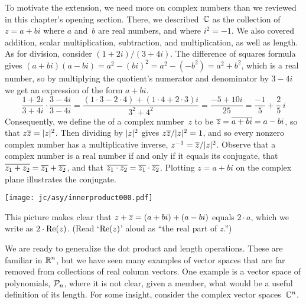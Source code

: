 To motivate the extension, 
we need more on complex numbers than we reviewed in this 
chapter's opening section.
There, we described~$\mathbb{C}$ as 
the collection of $z=a+bi$ where $a$ and~$b$ are real numbers,
and where $i^2=-1$. 
We also covered addition, scalar multiplication,
subtraction, and multiplication, as well as length.
As for division,  consider $(1+2i)/(3+4i)$.
The difference of squares formula
gives $(a+bi)(a-bi)=a^2-(bi)^2=a^2-(-b^2)=a^2+b^2$,
which is a real number,
so 
by multiplying the quotient's numerator and denominator by $3-4i$
we get an expression of the form $a+bi$.
\begin{equation*}
  \frac{1+2i}{3+4i}\cdot\frac{3-4i}{3-4i}
  =
  \frac{(1\cdot 3-2\cdot 4)+(1\cdot 4+2\cdot 3)i}{3^2+4^2}
  =
  \frac{-5+10i}{25}
  =
  \frac{-1}{5}+\frac{2}{5}\,i
\end{equation*}
Consequently, we define the  of a complex number~$z$
to be $\overline{z}=\overline{a+bi}=a-bi$, so that $z\overline{z}=\lvert z\rvert^2$.
Then dividing by $\lvert z\rvert^2$ gives $z\overline{z}/\lvert z\rvert^2=1$,
and so  
every nonzero complex number has a multiplicative inverse,
$z^{-1}=\overline{z}/\lvert z\rvert^2$.
Observe that a complex number is a real number if and only if 
it equals its conjugate, 
that $\overline{z_1+z_2}=\overline{z_1}+\overline{z_2}$,
and that $\overline{z_1\cdot z_2}=\overline{z_1}\cdot\overline{z_2}$.
Plotting $z=a+bi$ on the 
complex plane 
illustrates the conjugate.
\begin{center}
  \texttt{[image: jc/asy/innerproduct000.pdf]}
\end{center}
This picture makes clear that 
$z+\overline{z}=(a+bi)+(a-bi)$ equals
$2\cdot a$, which we write as $2\cdot\mathrm{Re}(z)$.
(Read `$\mathrm{Re}(z)$' aloud as ``the real part of $z$.'')

We are ready to generalize the dot product and
length operations.
These are familiar in $\mathbb{R}^n$, but we have seen many examples of 
vector spaces that are far removed from
collections of real column vectors.
One example is a vector space of polynomials, $\mathcal{P}_n$, 
where it is not clear, given a member,
what would be a useful definition of its length.
For some insight, consider the complex
vector spaces~$\mathbb{C}^n$.

